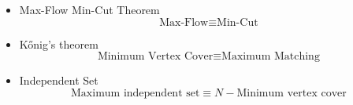 \begin{itemize}
\item Max-Flow Min-Cut Theorem
$$ \text{Max-Flow} \equiv \text{Min-Cut} $$
\end{itemize}

\begin{itemize}
\item Kőnig’s theorem
$$ \text{Minimum Vertex Cover} \equiv \text{Maximum Matching} $$
\end{itemize}

\begin{itemize}
\item Independent Set
$$ \text{Maximum independent set} \equiv N − \text{Minimum vertex cover} $$
\end{itemize}
